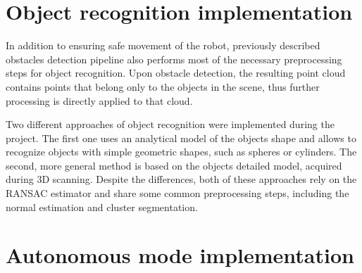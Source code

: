 \section{Object recognition implementation}
\label{sec:detection}

In addition to ensuring safe movement of the robot, previously described obstacles  detection pipeline also performs most of the necessary preprocessing steps for object recognition. Upon obstacle detection, the resulting point cloud contains points that belong only to the objects in the scene, thus further processing is directly applied to that cloud. 

Two different approaches of object recognition were implemented during the project. The first one uses an analytical model of the objects shape and allows to recognize objects with simple geometric shapes, such as spheres or cylinders. The second, more general method is based on the objects detailed model, acquired during 3D scanning. Despite the differences, both of these approaches rely on the RANSAC estimator and share some common preprocessing steps, including the normal estimation and cluster segmentation.


\section{Autonomous mode implementation}
\label{sec:autonomy}



